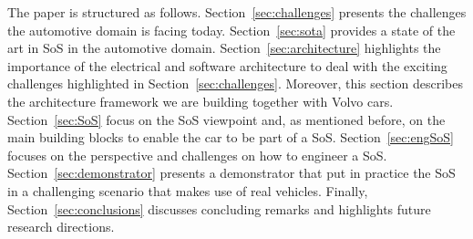 The paper is structured as follows. Section~\ref{sec:challenges} presents the challenges the automotive domain is facing today. Section~\ref{sec:sota} provides a state of the art in SoS in the automotive domain. Section~\ref{sec:architecture} highlights the importance of the electrical and software architecture to deal with the exciting challenges highlighted in Section~\ref{sec:challenges}. Moreover, this section describes the architecture framework we are building together with Volvo cars. Section~\ref{sec:SoS} focus on the SoS viewpoint and, as mentioned before, on the main building blocks to enable the car to be part of a SoS. Section~\ref{sec:engSoS} focuses on the perspective and challenges on how to engineer a SoS. Section~\ref{sec:demonstrator} presents a demonstrator that put in practice the SoS in a challenging scenario that makes use of real vehicles.
Finally, Section~\ref{sec:conclusions} discusses concluding remarks and highlights future research directions.